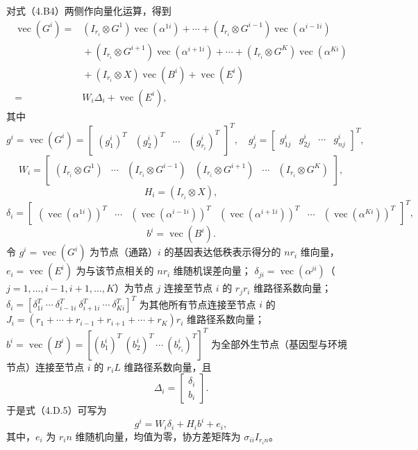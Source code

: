 对式（4.B4）两侧作向量化运算，得到
\begin{equation}
\begin{aligned}
\operatorname{vec}(G^i)
={}&(I_{r_i}\otimes G^1)\operatorname{vec}(\alpha^{1i})
+\cdots+(I_{r_i}\otimes G^{i-1})\operatorname{vec}(\alpha^{i-1i})\\
&{}+(I_{r_i}\otimes G^{i+1})\operatorname{vec}(\alpha^{i+1i})
+\cdots+(I_{r_i}\otimes G^K)\operatorname{vec}(\alpha^{Ki})\\
&{}+(I_{r_i}\otimes X)\operatorname{vec}(B^i)+\operatorname{vec}(E^i)\\
={}&W_i\Delta_i+\operatorname{vec}(E^i),
\end{aligned}\tag{4.D.5}
\end{equation}
其中
\[
g^i=\operatorname{vec}(G^i)=
\begin{bmatrix}(g_1^i)^T&(g_2^i)^T&\cdots&(g_{r_i}^i)^T\end{bmatrix}^T,
\quad g_j^i=\begin{bmatrix}g_{1j}^i&g_{2j}^i&\cdots&g_{nj}^i\end{bmatrix}^T,
\]
\[
W_i=\begin{bmatrix}
(I_{r_i}\otimes G^1)&\cdots&(I_{r_i}\otimes G^{i-1})&
(I_{r_i}\otimes G^{i+1})&\cdots&(I_{r_i}\otimes G^K)
\end{bmatrix},
\]
\[
H_i=(I_{r_i}\otimes X),
\]
\[
\delta_i=\begin{bmatrix}
(\operatorname{vec}(\alpha^{1i}))^T&\cdots&
(\operatorname{vec}(\alpha^{i-1i}))^T&
(\operatorname{vec}(\alpha^{i+1i}))^T&\cdots&
(\operatorname{vec}(\alpha^{Ki}))^T
\end{bmatrix}^T,
\]
\[
b^i=\operatorname{vec}(B^i).
\]
令 $g^i=\operatorname{vec}(G^i)$ 为节点（通路）$i$ 的基因表达低秩表示得分的 $nr_i$ 维向量，
$e_i=\operatorname{vec}(E^i)$ 为与该节点相关的 $nr_i$ 维随机误差向量；
$\delta_{ji}=\operatorname{vec}(\alpha^{ji})$（$j=1,\ldots,i-1,i+1,\ldots,K$）为节点 $j$ 连接至节点 $i$ 的 $r_jr_i$ 维路径系数向量；
$\delta_i=[\delta_{1i}^T\ \cdots\ \delta_{i-1i}^T\ \delta_{i+1i}^T\ \cdots\ \delta_{Ki}^T]^T$
为其他所有节点连接至节点 $i$ 的 $J_i=(r_1+\cdots+r_{i-1}+r_{i+1}+\cdots+r_K)r_i$ 维路径系数向量；
$b^i=\operatorname{vec}(B^i)=[(b_1^i)^T\ (b_2^i)^T\ \cdots\ (b_{r_i}^i)^T]^T$
为全部外生节点（基因型与环境节点）连接至节点 $i$ 的 $r_iL$ 维路径系数向量，且
\[
\Delta_i=\begin{bmatrix}\delta_i\\b_i\end{bmatrix}.
\]
于是式（4.D.5）可写为
\begin{equation}
g^i=W_i\delta_i+H_ib^i+e_i,\tag{4.D.6}
\end{equation}
其中，$e_i$ 为 $r_in$ 维随机向量，均值为零，协方差矩阵为 $\sigma_{ii}I_{r_in}$。

